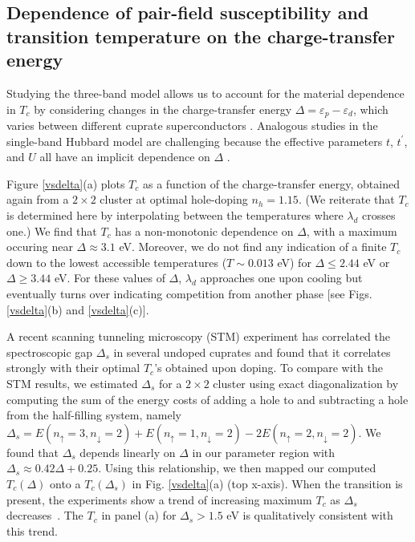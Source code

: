 \documentclass[reprint,nofootinbib,nobibnotes,amsmath,amssymb,aps,prb,floatfix]{revtex4-1}
\newcommand{\figdisp}[1]{Fig. \ref{#1}}
\begin{document}
\subsection{Dependence of pair-field susceptibility and transition temperature on the charge-transfer energy} 
Studying the three-band model allows us to account for the material dependence in $T_c$ by considering changes in the charge-transfer energy $\Delta = \varepsilon_p-\varepsilon_d$, which varies between different cuprate superconductors \cite{Ohta,Weber}. Analogous studies in the single-band Hubbard model are challenging because the effective parameters $t$, $t^\prime$, and $U$ all have an implicit dependence on $\Delta$ \cite{Ohta}. 

Figure \ref{vsdelta}(a) plots $T_c$ as a function of the charge-transfer energy, obtained again from a  $2\times2$ cluster at optimal hole-doping $n_h=1.15$. (We reiterate that $T_c$ is determined here by interpolating between the temperatures where $\lambda_d$ crosses one.) We find that $T_c$ has a non-monotonic dependence on $\Delta$, with a maximum occuring near $\Delta \approx 3.1$ eV. Moreover, we do not find any indication of a finite $T_c$ down to the lowest accessible temperatures ($T \sim 0.013$ eV) for $\Delta \le 2.44$ eV or $\Delta \ge 3.44$ eV. For these values of $\Delta$, $\lambda_d$ approaches one upon cooling but eventually turns over indicating competition from another phase [see Figs. \ref{vsdelta}(b) and \ref{vsdelta}(c)]. 



A recent scanning tunneling microscopy (STM) experiment \cite{Ruan} has correlated the spectroscopic gap $\Delta_s$ in several undoped cuprates and found that it correlates strongly with their optimal $T_c$'s obtained upon doping. To compare with the STM results, we estimated  $\Delta_s$ for a $2\times2$ cluster using exact diagonalization by computing 
the sum of the energy costs of adding a hole to and subtracting a hole from the half-filling system, namely $\Delta_s = E(n_\uparrow=3, n_\downarrow=2)+E(n_\uparrow=1, n_\downarrow=2) - 2E(n_\uparrow=2, n_\downarrow=2)$. 
We found that $\Delta_s$ depends linearly on $\Delta$ in our parameter region with $\Delta_s \approx 0.42\Delta+0.25$. Using this 
relationship, we then mapped our computed $T_c(\Delta)$ onto a $T_c(\Delta_s)$ in \figdisp{vsdelta}(a) (top x-axis). When the transition is present, the experiments show a trend of increasing maximum $T_c$ as $\Delta_s$ decreases~\cite{Ruan}. The $T_c$ in panel (a) for $\Delta_s>1.5$ eV is qualitatively consistent with this trend.
\end{document}
